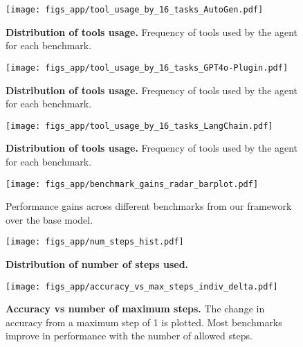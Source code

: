 \begin{figure*}[th!]
    \centering
    \texttt{[image: figs\_app/tool\_usage\_by\_16\_tasks\_AutoGen.pdf]}
    \vspace{-2mm}
    \caption{\textbf{Distribution of tools usage.} Frequency of tools used by the \autogen agent for each benchmark.
}
\label{fig:tool_usage_16_tasks_AutoGen}
\end{figure*}


\begin{figure*}[th!]
    \centering
    \texttt{[image: figs\_app/tool\_usage\_by\_16\_tasks\_GPT4o-Plugin.pdf]}
    \caption{\textbf{Distribution of tools usage.} Frequency of tools used by the \gptplugin agent for each benchmark.
}
\label{fig:tool_usage_16_tasks_GPT4o-Plugin}
\end{figure*}

\begin{figure*}[th!]
    \centering
    \texttt{[image: figs\_app/tool\_usage\_by\_16\_tasks\_LangChain.pdf]}
    \caption{\textbf{Distribution of tools usage.} Frequency of tools used by the \langchain agent for each benchmark.
}
\label{fig:tool_usage_16_tasks_LangChain}
\end{figure*}




\begin{figure}[th!]
    \centering
    \texttt{[image: figs\_app/benchmark\_gains\_radar\_barplot.pdf]}
    \caption{Performance gains across different benchmarks from our \model framework over the base \gpt model.}
\label{fig:benchmark_gains_radar_barplot}
\end{figure}


\begin{figure*}[th!]
    \centering
    \texttt{[image: figs\_app/num\_steps\_hist.pdf]}
    \caption{\textbf{Distribution of number of steps used.}}
\label{fig:distribution_of_number_of_steps}
\end{figure*}


\begin{figure*}[th!]
    \centering
    \texttt{[image: figs\_app/accuracy\_vs\_max\_steps\_indiv\_delta.pdf]}
    \caption{\textbf{Accuracy vs number of maximum steps.} The change in accuracy from a maximum step of 1 is plotted. Most benchmarks improve in performance with the number of allowed steps.}
\label{fig:accuracy_vs_max_steps}
\end{figure*}



